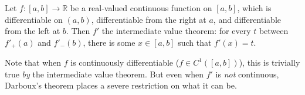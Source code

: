 \documentclass[12pt]{article}
\newcommand{\Reals}{\mathbb{R}}
\begin{document}
Let $f:[a,b]\to\Reals$ be a real-valued continuous function on $[a,b]$, which is differentiable on $(a,b)$, differentiable from the right at $a$, and differentiable from the left at $b$.  Then $f'$  the intermediate value theorem: for every $t$ between $f'_{+}(a)$ and $f'_{-}(b)$, there is some $x\in [a,b]$ such that $f'(x)=t$.

Note that when $f$ is continuously differentiable ($f\in C^1([a,b])$), this is trivially true \emph{by} the intermediate value theorem.  But even when $f'$ is \emph{not} continuous, Darboux's theorem places a severe restriction on what it can be.
\end{document}
